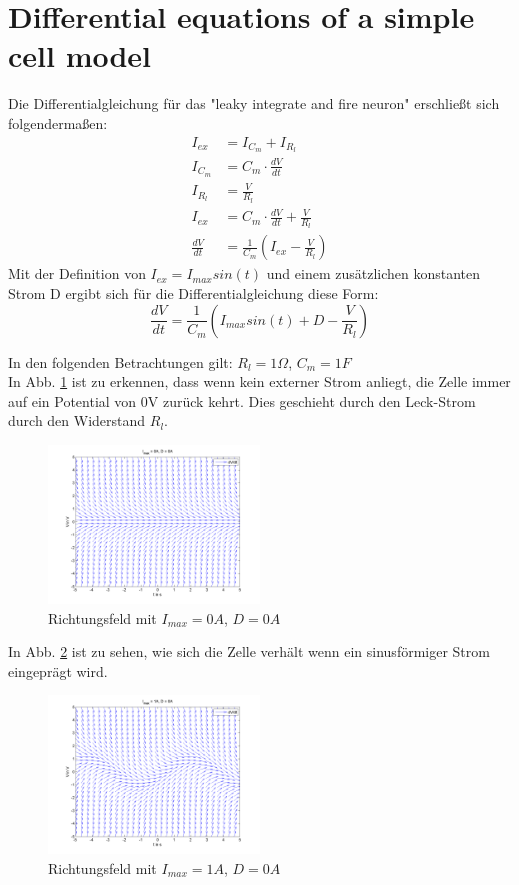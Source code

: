 \documentclass[conference]{IEEEtran}
\begin{document}
\section{Differential equations of a simple cell model}
Die Differentialgleichung für das "leaky integrate and fire neuron" erschließt sich folgendermaßen:
\begin{align}
I_{ex}  & = I_{C_m} + I_{R_l}\\
I_{C_m} & = C_m \cdot \frac{dV}{dt}\\
I_{R_l} & = \frac{V}{R_l}\\
I_{ex}  & = C_m \cdot \frac{dV}{dt} + \frac{V}{R_l}\\
\frac{dV}{dt} & = \frac{1}{C_m}(I_{ex} - \frac{V}{R_l})
\label{dgl}
\end{align}
Mit der Definition von $I_{ex} = I_{max} sin(t)$ und einem zusätzlichen konstanten Strom D ergibt sich für die Differentialgleichung diese Form:
\begin{equation}
	\frac{dV}{dt} = \frac{1}{C_m}(I_{max} sin(t) + D - \frac{V}{R_l})
\end{equation}

\newpage
In den folgenden Betrachtungen gilt: $R_l=1\Omega$, $C_m=1F$\\
In Abb. \ref{fig:slope1} ist zu erkennen, dass wenn kein externer Strom anliegt, die Zelle immer auf ein Potential von 0V zurück kehrt. Dies geschieht durch den Leck-Strom durch den Widerstand $R_l$.
\begin{figure}[h!]
	\centering
	\includegraphics[width=0.5\textwidth]{img/slopefield1.png}
	\caption{Richtungsfeld mit $I_{max}=0A$, $D=0A$}
	\label{fig:slope1}
\end{figure}

In Abb. \ref{fig:slope2} ist zu sehen, wie sich die Zelle verhält wenn ein sinusförmiger Strom eingeprägt wird. 
\begin{figure}[h!]
	\centering
	\includegraphics[width=0.5\textwidth]{img/slopefield2.png}
	\caption{Richtungsfeld mit $I_{max}=1A$, $D=0A$}
	\label{fig:slope2}
\end{figure}
\end{document}
